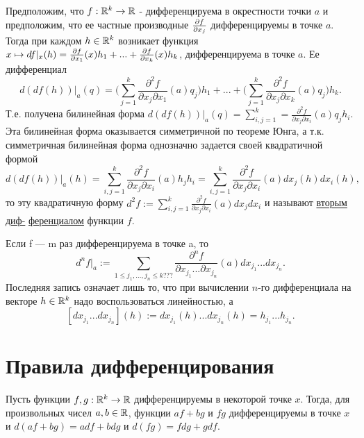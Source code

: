     Предположим, что $f : \mathbb R^k \rightarrow \mathbb R$ - дифференцируема в окрестности точки $a$ и предположим, что ее частные производные $\pdv{f}{x_j}$ дифференцируемы в точке $a$. Тогда при каждом $h \in \mathbb R^k$ возникает функция $x \mapsto df|_x (h) = \frac{\partial f}{\partial x_1}(x) h_1 + ... + \frac{\partial f}{\partial x_k}(x) h_k$, дифференцируема в точке $a$. Ее дифференциал
    \[ d(df(h))|_a (q) = \bigg(\sum_{j = 1}^k \frac{\partial^2 f}{\partial x_j \partial x_1}(a) q_j \bigg) h_1 + ... + \bigg(\sum_{j = 1}^k \frac{\partial^2 f}{\partial x_j \partial x_k}(a) q_j \bigg) h_k. \]
    Т.е. получена билинейная форма $d(df(h))|_a (q) = \sum_{i, j = 1}^k = \frac{\partial^2 f}{\partial x_j \partial x_i}(a) q_j h_i$. Эта билинейная форма оказывается симметричной по теореме Юнга, а т.к. симметричная билинейная форма однозначно задается своей квадратичной формой
    \[ d(df(h))|_a (h) = \sum_{i, j = 1}^k \frac{\partial^2 f}{\partial x_j \partial x_i}(a) h_j h_i = \sum_{i, j = 1}^k \frac{\partial^2 f}{\partial x_j \partial x_i}(a) dx_j(h) dx_i(h),\]
    то эту квадратичную форму $d^2 f := \sum_{i,j = 1}^k \frac{\partial^2 f}{\partial x_j \partial x_i}(a) dx_j dx_i$ и называют \underline{вторым диф-} \underline{ференциалом} функции $f$.
    
    \begin{definition}
    	Если f — m раз дифференцируема в точке a, то
    	\[  d^n f|_a := \sum_{1 \leqslant j_1, ..., j_n \leqslant k???} \frac{\partial^n f}{\partial x_{j_1} ... \partial x_{j_n}}(a) dx_{j_1} ... dx_{j_n}. \]
    	Последняя запись означает лишь то, что при вычислении $n$-го дифференциала на векторе $h \in \mathbb R^k$ надо воспользоваться линейностью, а
    	\[ [dx_{j_1} ... dx_{j_n}](h) := dx_{j_1}(h) ... dx_{j_n}(h) = h_{j_1} ... h_{j_n}. \]
    \end{definition}
    
    \section{Правила дифференцирования}
    
    \begin{theorem}
    	Пусть функции $f, g : \mathbb R^k \rightarrow \mathbb R$ дифференцируемы в некоторой точке $x$. Тогда, для произвольных чисел $a, b \in \mathbb R$, функции $af + bg$ и $fg$ дифференцируемы в точке $x$ и $d(af + bg) = adf + bdg$ и $d(fg) = fdg + gdf$.
    \end{theorem}
    
